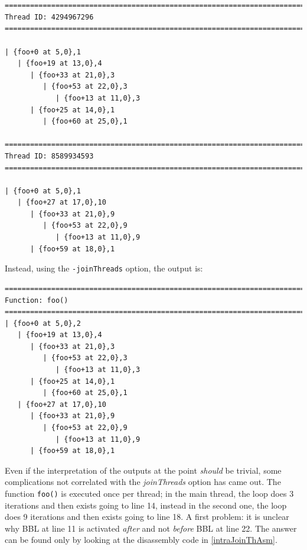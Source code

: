 \documentclass[a4paper,10pt]{report}
\begin{document}
\begin{lstlisting}[label=out11, caption={the output of IHPP analyzing \texttt{prog5}}]


=============================================================================
Thread ID: 4294967296
=============================================================================

| {foo+0 at 5,0},1
   | {foo+19 at 13,0},4
      | {foo+33 at 21,0},3
         | {foo+53 at 22,0},3
            | {foo+13 at 11,0},3
      | {foo+25 at 14,0},1
         | {foo+60 at 25,0},1

=============================================================================
Thread ID: 8589934593
=============================================================================

| {foo+0 at 5,0},1
   | {foo+27 at 17,0},10
      | {foo+33 at 21,0},9
         | {foo+53 at 22,0},9
            | {foo+13 at 11,0},9
      | {foo+59 at 18,0},1

\end{lstlisting}

\noindent
Instead, using the \verb|-joinThreads| option, the output is:

\begin{lstlisting}[label=out12, 
caption={the output of IHPP analyzing \texttt{prog5} with \texttt{-joinThreads}}]
=============================================================================
Function: foo()
=============================================================================
| {foo+0 at 5,0},2
   | {foo+19 at 13,0},4
      | {foo+33 at 21,0},3
         | {foo+53 at 22,0},3
            | {foo+13 at 11,0},3
      | {foo+25 at 14,0},1
         | {foo+60 at 25,0},1
   | {foo+27 at 17,0},10
      | {foo+33 at 21,0},9
         | {foo+53 at 22,0},9
            | {foo+13 at 11,0},9
      | {foo+59 at 18,0},1

\end{lstlisting}

\noindent
Even if the interpretation of the outputs at the point \emph{should} be trivial,
some complications not correlated with the \emph{joinThreads} option 
has came out.
The function \verb|foo()| is executed once per thread; in the main thread, the loop does 3 iterations and then exists going to line 14, instead
in the second one, the loop does 9 iterations and then exists going to line 18.
A first problem: it is unclear why BBL at line 11 is activated \emph{after} 
and not \emph{before} BBL at line 22. The answer can be found only by looking at
the disassembly code in \cref{intraJoinThAsm}.
\end{document}
